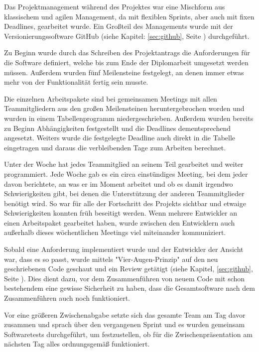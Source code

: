 \label{sec:ProManZELIA}

Das Projektmanagement während des Projektes war eine Mischform aus klassischem und agilen Management, da mit flexiblen Sprints, aber auch mit fixen Deadlines, gearbeitet wurde. Ein Großteil des Managements wurde mit der Versionierungssoftware GitHub (siehe Kapitel: \ref{sec:github}, Seite \pageref{sec:github}) durchgeführt.

Zu Beginn wurde durch das Schreiben des Projektantrags die Anforderungen für die Software definiert, welche bis zum Ende der Diplomarbeit umgesetzt werden müssen. Außerdem wurden fünf Meilensteine festgelegt, an denen immer etwas mehr von der Funktionalität fertig sein musste.

Die einzelnen Arbeitspakete sind bei gemeinsamen Meetings mit allen Teammitgliedern aus den großen Meilensteinen heruntergebrochen worden und wurden in einem Tabellenprogramm niedergeschrieben. Außerdem wurden bereits zu Beginn Abhängigkeiten festgestellt und die Deadlines dementsprechend angesetzt. Weiters wurde die festgelegte Deadline auch direkt in die Tabelle eingetragen und daraus die verbleibenden Tage zum Arbeiten berechnet.  

Unter der Woche hat jedes Teammitglied an seinem Teil gearbeitet und weiter programmiert. Jede Woche gab es ein circa einstündiges Meeting, bei dem jeder davon berichtete, an was er im Moment arbeitet und ob es damit irgendwo Schwierigkeiten gibt, bei denen die Unterstützung der anderen Teammitglieder benötigt wird. So war für alle der Fortschritt des Projekts sichtbar und etwaige Schwierigkeiten konnten früh beseitigt werden. Wenn mehrere Entwickler an einen Arbeitspaket gearbeitet haben, wurde zwischen den Entwicklern auch außerhalb dieses wöchentlichen Meetings viel miteinander kommuniziert.

Sobald eine Anforderung implementiert wurde und der Entwickler der Ansicht war, dass es so passt, wurde mittels "Vier-Augen-Prinzip" auf den neu geschriebenen Code geschaut und ein Review getätigt (siehe Kapitel, \ref{sec:github}, Seite \pageref{sec:github}). Dies dient dazu, vor dem Zusammenführen von neuem Code mit schon bestehendem eine gewisse Sicherheit zu haben, dass die Gesamtsoftware nach dem Zusammenführen auch noch funktioniert.

Vor eine größeren Zwischenabgabe setzte sich das gesamte Team am Tag davor zusammen und sprach über den vergangenen Sprint und es wurden gemeinsam Softwaretests durchgeführt, um festzustellen, ob für die Zwischenpräsentation am nächsten Tag alles ordnungsgemäß funktioniert. 
